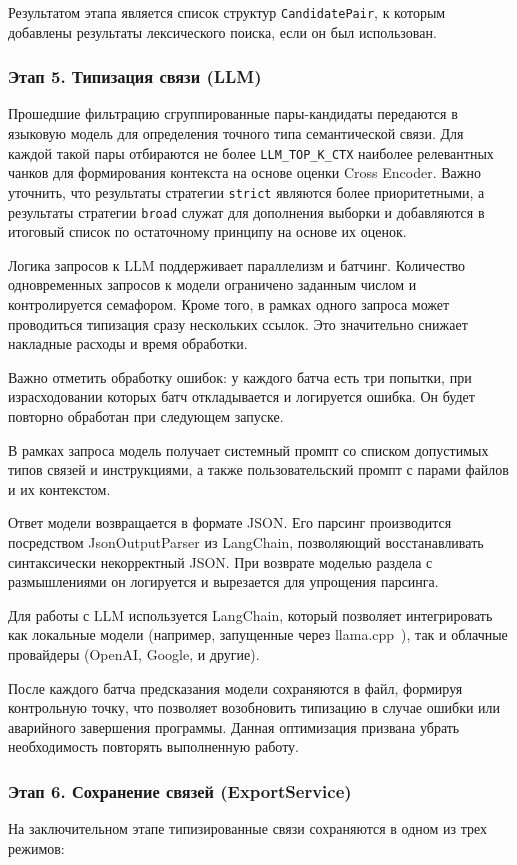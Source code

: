 Результатом этапа является список структур \texttt{CandidatePair},
к которым добавлены результаты лексического поиска, если он был использован.

\subsubsection*{Этап 5. Типизация связи (LLM)}
Прошедшие фильтрацию сгруппированные пары-кандидаты
передаются в языковую модель для определения точного типа семантической связи.
Для каждой такой пары отбираются не более \texttt{LLM\_TOP\_K\_CTX}
наиболее релевантных чанков для формирования контекста
на основе оценки Cross Encoder.
Важно уточнить, что результаты стратегии \texttt{strict}
являются более приоритетными, а
результаты стратегии \texttt{broad}
служат для дополнения выборки и
добавляются в итоговый список
по остаточному принципу на основе их оценок.

Логика запросов к LLM поддерживает параллелизм и батчинг.
Количество одновременных запросов к модели ограничено заданным числом и контролируется семафором.
Кроме того, в рамках одного запроса может проводиться типизация сразу нескольких ссылок.
Это значительно снижает накладные расходы и время обработки.

Важно отметить обработку ошибок: у каждого батча есть три попытки, при израсходовании которых
батч откладывается и логируется ошибка. Он будет повторно обработан при следующем запуске.

В рамках запроса модель получает системный промпт со списком допустимых типов связей и инструкциями,
а также пользовательский промпт с парами файлов и их контекстом.

Ответ модели возвращается в формате JSON. Его парсинг производится посредством JsonOutputParser
из LangChain, позволяющий восстанавливать синтаксически некорректный JSON.
При возврате моделью раздела с размышлениями
он логируется и вырезается для упрощения парсинга.

Для работы с LLM используется LangChain,
который позволяет интегрировать
как локальные модели
(например, запущенные через llama.cpp~\cite{Gerganov_llamacpp}),
так и облачные провайдеры (OpenAI, Google, и другие).

После каждого батча предсказания модели сохраняются в файл,
формируя контрольную точку, что позволяет возобновить типизацию
в случае ошибки или аварийного завершения программы.
Данная оптимизация призвана
убрать необходимость повторять выполненную работу.

\subsubsection*{Этап 6. Сохранение связей (ExportService)}
На заключительном этапе типизированные связи сохраняются в одном из трех режимов:

